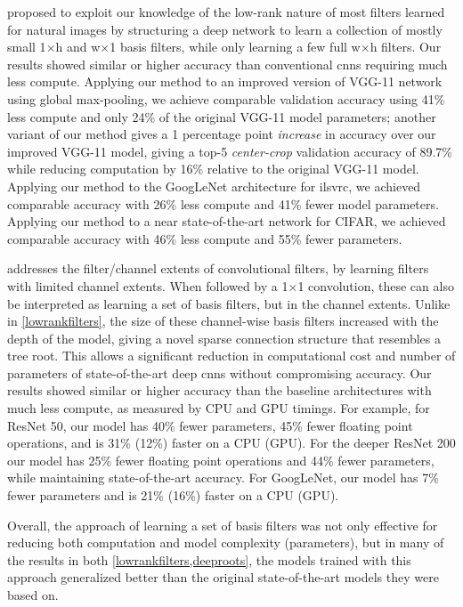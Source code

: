 \documentclass[thesis]{subfiles}
\begin{document}
 proposed to exploit our knowledge of the low-rank nature of most filters learned for natural images by structuring a deep network to learn a collection of mostly small 1$\times$h and w$\times$1 basis filters, while only learning a few full w$\times$h filters. Our results showed similar or higher accuracy than conventional \glspl{cnn} requiring much less compute. Applying our method to an improved version of VGG-11 network using global max-pooling, we achieve comparable validation accuracy using 41\% less compute and only 24\% of the original VGG-11 model parameters; another variant of our method gives a 1 percentage point {\em increase} in accuracy over our improved VGG-11 model, giving a top-5 \emph{center-crop} validation accuracy of 89.7\% while reducing computation by 16\% relative to the original VGG-11 model. Applying our method to the GoogLeNet architecture for \gls{ilsvrc}, we achieved comparable accuracy with 26\% less compute and 41\% fewer model parameters. Applying our method to a near state-of-the-art network for CIFAR, we achieved comparable accuracy with 46\% less compute and 55\% fewer parameters. 
	
 addresses the filter/channel extents of convolutional filters, by learning filters with limited channel extents. When followed by a 1$\times$1 convolution, these can also be interpreted as learning a set of basis filters, but in the channel extents. 
Unlike in \cref{lowrankfilters}, the size of these channel-wise basis filters increased with the depth of the model, giving a novel sparse connection structure that resembles a tree root. This allows a significant reduction in computational cost and number of parameters of state-of-the-art deep \glspl{cnn} without compromising accuracy. Our results showed similar or higher accuracy than the baseline architectures with much less compute, as measured by CPU and GPU timings. For example, for ResNet 50, our model has 40\% fewer parameters, 45\% fewer floating point operations, and is 31\% (12\%) faster on a CPU (GPU). For the deeper ResNet 200 our model has 25\% fewer floating point operations and 44\% fewer parameters, while maintaining state-of-the-art accuracy. For GoogLeNet, our model has 7\% fewer parameters and is 21\% (16\%) faster on a CPU (GPU).

Overall, the approach of learning a set of basis filters was not only effective for reducing both computation and model complexity (parameters), but in many of the results in both \cref{lowrankfilters,deeproots}, the models trained with this approach generalized better than the original state-of-the-art models they were based on.
\end{document}
